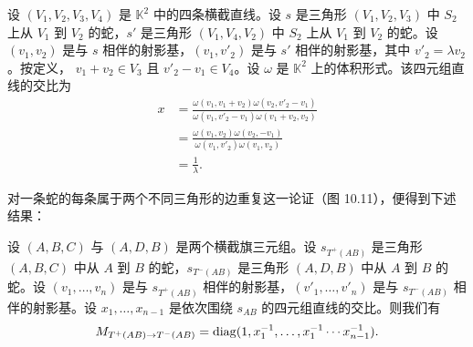 

设 $(V_1,V_2,V_3,V_4)$ 是 $\mathbb{K}^2$ 中的四条横截直线。设 $s$ 是三角形 $(V_1,V_2,V_3)$ 中 $S_2$ 上从 $V_1$ 到 $V_2$ 的蛇，$s'$ 是三角形 $(V_1,V_4,V_2)$ 中 $S_2$ 上从 $V_1$ 到 $V_2$ 的蛇。设 $(v_1,v_2)$ 是与 $s$ 相伴的射影基，$(v_1,v'_2)$ 是与 $s'$ 相伴的射影基，其中 $v'_2=\lambda v_2$。按定义，
$v_1+v_2\in V_3$ 且 $v'_2-v_1\in V_4$。设 $\omega$ 是 $\mathbb{K}^2$ 上的体积形式。该四元组直线的交比为
\begin{align*}
x &= \frac{\omega(v_1,v_1+v_2)\omega(v_2,v'_2-v_1)}{\omega(v_1,v'_2-v_1)\omega(v_1+v_2,v_2)}\\
&= \frac{\omega(v_1,v_2)\omega(v_2,-v_1)}{\omega(v_1,v'_2)\omega(v_1,v_2)}\\
&= \frac{1}{\lambda}.
\end{align*}


对一条蛇的每条属于两个不同三角形的边重复这一论证（图 10.11），便得到下述结果：

\begin{theorem}[10.29] 设 $(A,B,C)$ 与 $(A,D,B)$ 是两个横截旗三元组。设 $s_{T^+(AB)}$ 是三角形 $(A,B,C)$ 中从 $A$ 到 $B$ 的蛇，$s_{T^-(AB)}$ 是三角形 $(A,D,B)$ 中从 $A$ 到 $B$ 的蛇。设 $(v_1,\dots,v_n)$ 是与 $s_{T^+(AB)}$ 相伴的射影基，$(v'_1,\dots,v'_n)$ 是与
$s_{T^-(AB)}$ 相伴的射影基。设 $x_1,\dots,x_{n-1}$ 是依次围绕 $s_{AB}$ 的四元组直线的交比。则我们有
\[
M_{T^+(AB)\to T^-(AB)}=\operatorname{diag}(1,x_1^{-1},\dots,x_1^{-1}\cdots x_{n-1}^{-1}).
\]
\end{theorem}

